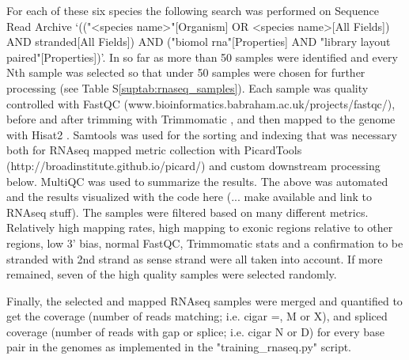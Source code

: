 \documentclass{bioinfo}
\newcounter{suptab}
\begin{document}
\begin{methods}
For each of these six species the following search was performed on Sequence Read Archive
`(("<species name>"[Organism] OR <species name>[All Fields]) AND stranded[All Fields]) 
AND ("biomol rna"[Properties] AND "library layout paired"[Properties])'. In so far as 
more than 50 samples were identified and every Nth sample was selected so that under 50
samples were chosen for further processing (see Table S\ref{suptab:rnaseq_samples}).
Each sample was quality controlled with FastQC (www.bioinformatics.babraham.ac.uk/projects/fastqc/), before and after trimming
with Trimmomatic \citep{bolger2014trimmomatic}, and then mapped to the genome with Hisat2 \citep{kim2019graph}. 
Samtools \citep{li2009sequence} was used for the sorting and indexing that was necessary both for
RNAseq mapped metric collection with PicardTools (http://broadinstitute.github.io/picard/) and custom downstream 
processing below. MultiQC \citep{ewels2016multiqc} was used to summarize the results. The above was 
automated and the results visualized with the code here (... make available and link to RNAseq stuff).
The samples were filtered based on many different metrics. Relatively high mapping rates, high mapping to
exonic regions relative to other regions, low 3' bias, normal FastQC, Trimmomatic stats and a confirmation
to be stranded with 2nd strand as sense strand were all taken into account. If more remained, seven
of the high quality samples were selected randomly.

Finally, the selected and mapped RNAseq samples were merged and quantified to
get the coverage (number of reads matching; i.e. cigar =, M or X),
and spliced coverage (number of reads with gap or splice; i.e. cigar N or D)
for every base pair in the genomes as implemented in the "training\_rnaseq.py"
script.

\end{methods}
\end{document}
